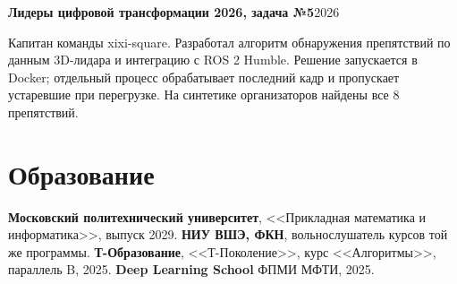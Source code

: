 \documentclass[10pt,a4paper]{article}
\newcommand{\role}[2]{\textbf{#1}\hfill #2\par}
\begin{document}
\vspace{3pt}
\role{Лидеры цифровой трансформации 2026, задача №5}{2026}
Капитан команды xixi-square. Разработал алгоритм обнаружения препятствий по данным 3D-лидара
и интеграцию с ROS 2 Humble. Решение запускается в Docker; отдельный процесс обрабатывает
последний кадр и пропускает устаревшие при перегрузке. На синтетике организаторов
найдены все 8 препятствий.

\section{Образование}
\textbf{Московский политехнический университет}, <<Прикладная математика и информатика>>,
выпуск 2029. \textbf{НИУ ВШЭ, ФКН}, вольнослушатель курсов той же программы.
\textbf{Т-Образование}, <<Т-Поколение>>, курс <<Алгоритмы>>, параллель B, 2025.
\textbf{Deep Learning School} ФПМИ МФТИ, 2025.
\end{document}
